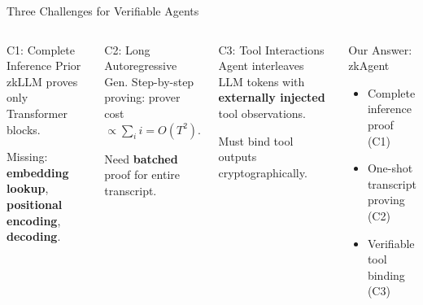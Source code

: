\documentclass[aspectratio=169,10pt]{beamer}
\newcommand{\pos}[1]{\textcolor{positive}{#1}}
\begin{document}
\begin{frame}{Three Challenges for Verifiable Agents}
\begin{columns}[T]
\begin{exampleblock}{C1: Complete Inference}
Prior zkLLM proves only Transformer blocks.

Missing: \textbf{embedding lookup}, \textbf{positional encoding}, \textbf{decoding}.
\end{exampleblock}

\vspace{6pt}
\begin{exampleblock}{C2: Long Autoregressive Gen.}
Step-by-step proving: prover cost $\propto \sum_{i} i = O(T^2)$.

Need \textbf{batched} proof for entire transcript.
\end{exampleblock}

\begin{exampleblock}{C3: Tool Interactions}
Agent interleaves LLM tokens with \textbf{externally injected} tool observations.

Must bind tool outputs cryptographically.
\end{exampleblock}

\vspace{6pt}
\begin{block}{Our Answer: zkAgent}
\begin{itemize}
  \item \pos{Complete} inference proof (C1)
  \item \pos{One-shot} transcript proving (C2)
  \item \pos{Verifiable} tool binding (C3)
\end{itemize}
\end{block}
\end{columns}
\end{frame}

\end{document}

